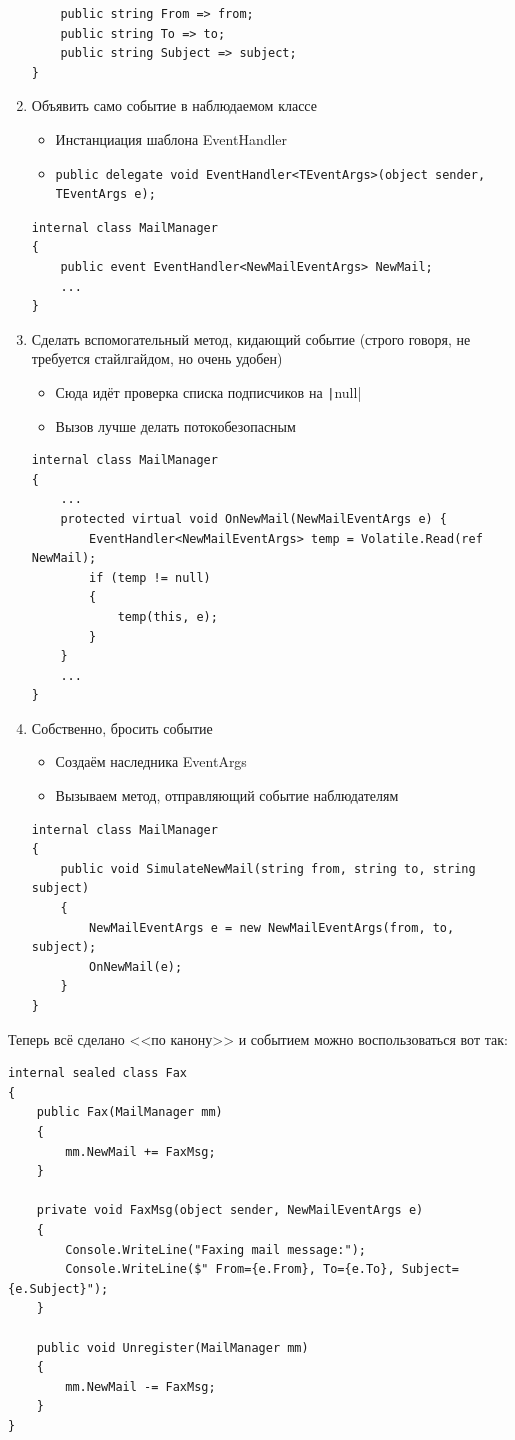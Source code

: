 \documentclass[a5paper]{article}
\begin{document}
\begin{enumerate}
\begin{verbatim}
    public string From => from;
    public string To => to;
    public string Subject => subject;
}
		\end{verbatim}
	\item Объявить само событие в наблюдаемом классе
		\begin{itemize}
			\item Инстанциация шаблона EventHandler
			\item 
				\begin{verbatim}
public delegate void EventHandler<TEventArgs>(object sender, TEventArgs e);
				\end{verbatim}
		\end{itemize}
		\begin{verbatim}
internal class MailManager 
{
    public event EventHandler<NewMailEventArgs> NewMail;
    ...
}
		\end{verbatim}
	\item Сделать вспомогательный метод, кидающий событие (строго говоря, не требуется стайлгайдом, но очень удобен)
		\begin{itemize}
			\item Сюда идёт проверка списка подписчиков на \texttt|null|
			\item Вызов лучше делать потокобезопасным
		\end{itemize}
		\begin{verbatim}
internal class MailManager 
{
    ...
    protected virtual void OnNewMail(NewMailEventArgs e) {
        EventHandler<NewMailEventArgs> temp = Volatile.Read(ref NewMail);
        if (temp != null) 
        {
            temp(this, e);
        }
    }
    ...
}
		\end{verbatim}
	\item Собственно, бросить событие
		\begin{itemize}
			\item Создаём наследника EventArgs
			\item Вызываем метод, отправляющий событие наблюдателям
		\end{itemize}
		\begin{verbatim}
internal class MailManager 
{
    public void SimulateNewMail(string from, string to, string subject) 
    {
        NewMailEventArgs e = new NewMailEventArgs(from, to, subject);
        OnNewMail(e);
    }
}
		\end{verbatim}
\end{enumerate}

Теперь всё сделано <<по канону>> и событием можно воспользоваться вот так:
\begin{verbatim}
internal sealed class Fax 
{
    public Fax(MailManager mm) 
    {
        mm.NewMail += FaxMsg;
    }

    private void FaxMsg(object sender, NewMailEventArgs e) 
    {
        Console.WriteLine("Faxing mail message:");
        Console.WriteLine($" From={e.From}, To={e.To}, Subject={e.Subject}");
    }

    public void Unregister(MailManager mm) 
    {
        mm.NewMail -= FaxMsg;
    }
}
\end{verbatim}
\end{document}
